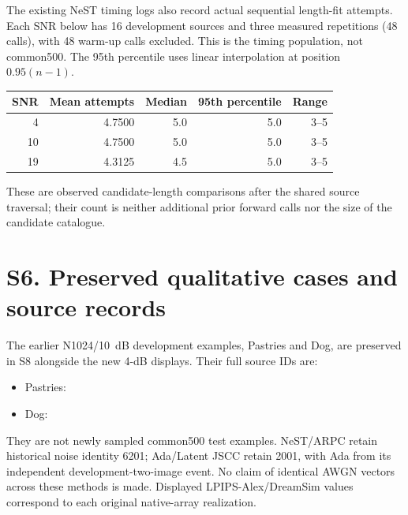 \documentclass[11pt,letterpaper]{article}
\begin{document}
The existing NeST timing logs also record actual sequential length-fit attempts. Each SNR below has 16 development sources and three measured repetitions (48 calls), with 48 warm-up calls excluded. This is the timing population, not common500. The 95th percentile uses linear interpolation at position $0.95(n-1)$.
\begin{center}\small\begin{tabular}{rrrrr}\toprule
SNR & Mean attempts & Median & 95th percentile & Range\\\midrule

4 & 4.7500 & 5.0 & 5.0 & 3--5\\
10 & 4.7500 & 5.0 & 5.0 & 3--5\\
19 & 4.3125 & 4.5 & 5.0 & 3--5\\
\bottomrule\end{tabular}\end{center}
These are observed candidate-length comparisons after the shared source traversal; their count is neither additional prior forward calls nor the size of the candidate catalogue.


\clearpage\section*{S6. Preserved qualitative cases and source records}
The earlier N1024/10~dB development examples, Pastries and Dog, are preserved in S8 alongside the new 4-dB displays. Their full source IDs are:
\begin{itemize}
\item Pastries: 
\item Dog: 
\end{itemize}
They are not newly sampled common500 test examples. NeST/ARPC retain historical noise identity 6201; Ada/Latent JSCC retain 2001, with Ada from its independent development-two-image event. No claim of identical AWGN vectors across these methods is made. Displayed LPIPS-Alex/DreamSim values correspond to each original native-array realization.
\end{document}
